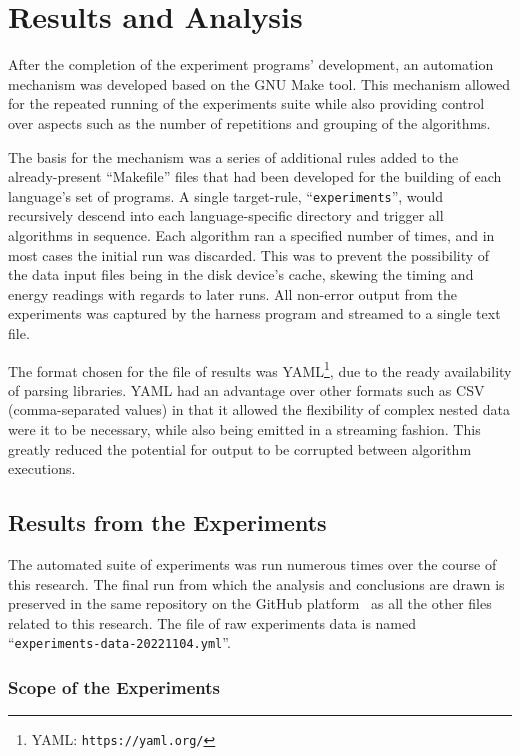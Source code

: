 \section{Results and Analysis}
\label{sec:results}

After the completion of the experiment programs' development, an automation mechanism was developed based on the GNU Make tool. This mechanism allowed for the repeated running of the experiments suite while also providing control over aspects such as the number of repetitions and grouping of the algorithms.

The basis for the mechanism was a series of additional rules added to the already-present ``Makefile'' files that had been developed for the building of each language's set of programs. A single target-rule, ``\texttt{experiments}'', would recursively descend into each language-specific directory and trigger all algorithms in sequence. Each algorithm ran a specified number of times, and in most cases the initial run was discarded. This was to prevent the possibility of the data input files being in the disk device's cache, skewing the timing and energy readings with regards to later runs. All non-error output from the experiments was captured by the harness program and streamed to a single text file.

The format chosen for the file of results was YAML\footnote{YAML: \texttt{https://yaml.org/}}, due to the ready availability of parsing libraries. YAML had an advantage over other formats such as CSV (comma-separated values) in that it allowed the flexibility of complex nested data were it to be necessary, while also being emitted in a streaming fashion. This greatly reduced the potential for output to be corrupted between algorithm executions.

\subsection{Results from the Experiments}
\label{subsec:results}

The automated suite of experiments was run numerous times over the course of this research. The final run from which the analysis and conclusions are drawn is preserved in the same repository on the GitHub platform~\cite{github} as all the other files related to this research. The file of raw experiments data is named ``\texttt{experiments-data-20221104.yml}''.

\subsubsection{Scope of the Experiments}

